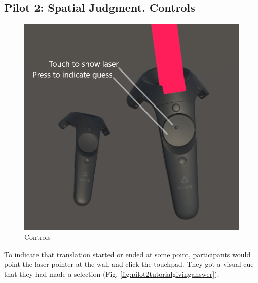 \begin{appendices}

\chapter{Pilot 2: Spatial Judgment. Controls}
\label{app:pilot2_controls}
\begin{figure}[h]
	\centering
	\includegraphics[width=0.7\linewidth]{figures/pilot2_tutorial_controllers_with_explanation}
	\caption{Controls}
	\label{fig:pilot2tutorialcontrollerswithexplanation}
\end{figure}

To indicate that translation started or ended at some point, participants would point the laser pointer at the wall and click the touchpad. They got a visual cue that they had made a selection (Fig. \ref{fig:pilot2tutorialgivinganswer}).

\begin{figure}
	\centering
	

\end{figure}
\end{appendices}
